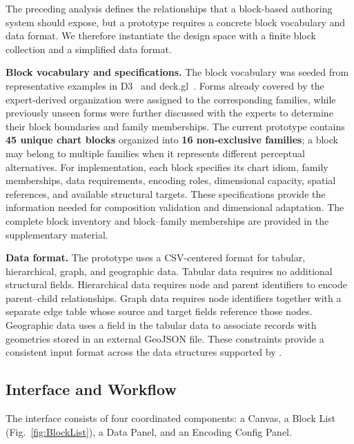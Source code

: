 The preceding analysis defines the relationships that a block-based authoring
system should expose, but a prototype requires a concrete block vocabulary and
data format. We therefore instantiate the design space with a finite block
collection and a simplified data format.

\textbf{Block vocabulary and specifications.}
The block vocabulary was seeded from representative examples in D3~\cite{D3} and
deck.gl~\cite{deckgl}. Forms already covered by the expert-derived organization were assigned
to the corresponding families, while previously unseen forms were further
discussed with the experts to determine their block boundaries and family
memberships. The current prototype contains \textbf{45 unique chart blocks}
organized into \textbf{16 non-exclusive families}; a block may belong to
multiple families when it represents different perceptual alternatives.
For implementation, each block specifies its chart idiom, family memberships,
data requirements, encoding roles, dimensional capacity, spatial references,
and available structural targets. These specifications provide the information
needed for composition validation and dimensional adaptation. The complete
block inventory and block--family memberships are provided in the
supplementary material.

\textbf{Data format.}
The prototype uses a CSV-centered format for tabular, hierarchical, graph, and
geographic data. Tabular data requires no additional structural fields.
Hierarchical data requires node and parent identifiers to encode parent--child
relationships. Graph data requires node identifiers together with a separate
edge table whose source and target fields reference those nodes. Geographic
data uses a field in the tabular data to associate records with geometries
stored in an external GeoJSON file. These constraints provide a consistent
input format across the data structures supported by {\system}.

\subsection{Interface and Workflow}
\label{sec:interface}

The interface consists of four coordinated components: a Canvas, a Block List (Fig.~\ref{fig:BlockList}),
a Data Panel, and an Encoding Config Panel.


